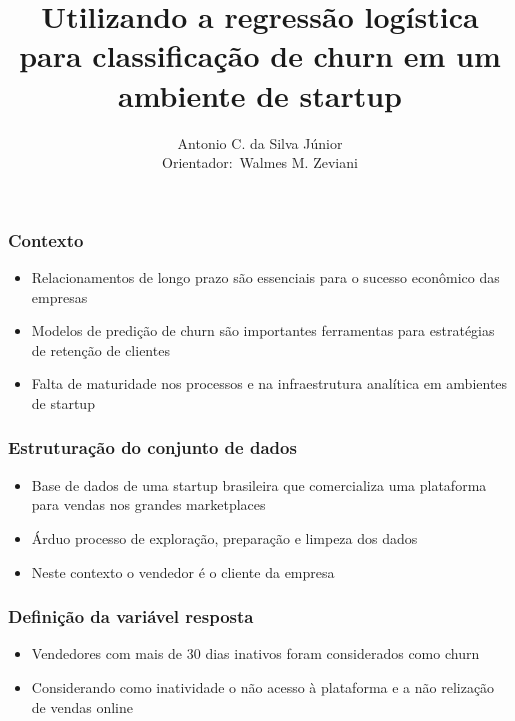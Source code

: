 \documentclass{beamer}
\title[Classificação de Churn]
{Utilizando a regressão logística para classificação de churn em um ambiente de startup}
\author[Silva Júnior, A. C.]{Antonio C. da Silva Júnior \\ 
Orientador$:$ Walmes M. Zeviani}
\date[DSBD Agosto 2020] %
{Especialização em Data Science e Big Data

Universidade Federal do Paraná

Agosto 2020}
\begin{document}
\frame{\titlepage}

\begin{frame}
    \frametitle{Contexto}
    \begin{itemize}
        \item Relacionamentos de longo prazo são essenciais para o sucesso econômico das empresas
        \item Modelos de predição de churn são importantes ferramentas para estratégias de retenção de clientes
        \item Falta de maturidade nos processos e na infraestrutura analítica em ambientes de startup
    \end{itemize}
\end{frame}

\begin{frame}
    \frametitle{Estruturação do conjunto de dados}
    \begin{itemize}
        \item Base de dados de uma startup brasileira que comercializa uma plataforma para vendas nos grandes marketplaces
        \item Árduo processo de exploração, preparação e limpeza dos dados
        \item Neste contexto o vendedor é o cliente da empresa
    \end{itemize}
\end{frame}

\begin{frame}
    \frametitle{Definição da variável resposta}
    \begin{itemize}
        \item Vendedores com mais de 30 dias inativos foram considerados como churn
        \item Considerando como inatividade o não acesso à plataforma e a não relização de vendas online
    \end{itemize}
\end{frame}
\end{document}
